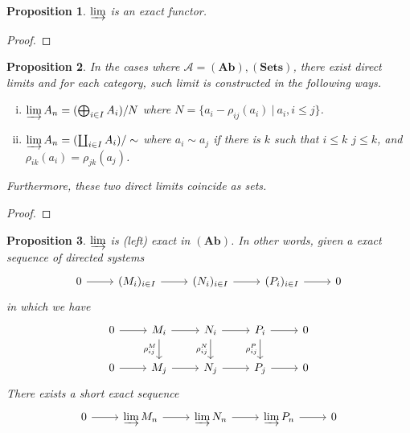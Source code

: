 \documentclass{article}
\newtheorem{proposition}{Proposition}[section]
\numberwithin{equation}{section}
\begin{document}
\begin{proposition}
\label{direct_limit_exact_functor}
$\varinjlim$ is an exact functor.\
\end{proposition}

\begin{proof}
\end{proof}

\begin{proposition}
In the cases where $\mathcal{A}=(\mathbf{Ab}),(\mathbf{Sets})$, there exist direct limits and for each category, such limit is constructed in the following ways.
\begin{enumerate}[i).]
\item $\varinjlim A_n = (\bigoplus_{i\in I}A_i)/N$ where $N=\{a_i-\rho_{ij}(a_i)\:|\:a_i,i\leq j\}$.
\item $\varinjlim A_n = (\coprod_{i\in I}A_i)/\sim$ where $a_i\sim a_j$ if there is $k$ such that $i\leq k$ $j\leq k$, and $\rho_{ik}(a_i)=\rho_{jk}(a_j)$.
\end{enumerate}
Furthermore, these two direct limits coincide as sets.
\end{proposition}

\begin{proof}
\end{proof}

\begin{proposition}
$\varinjlim$ is (left) exact in $(\mathbf{Ab})$. In other words, 
given a exact sequence of directed systems 
\[
\begin{tikzcd}
0 \arrow[r] & (M_i)_{i\in I} \arrow[r] & (N_i)_{i\in I} \arrow[r] & (P_i)_{i\in I} \arrow[r] & 0
\end{tikzcd}
\]
in which we have
\[
\begin{tikzcd}
0 \arrow[r] & M_i \arrow[r] \arrow[d, "\rho^M_{ij}"'] & N_i \arrow[r] \arrow[d, "\rho^N_{ij}"'] & P_i \arrow[r] \arrow[d, "\rho^P_{ij}"'] & 0 \\
0 \arrow[r] & M_j \arrow[r]                           & N_j \arrow[r]                           & P_j \arrow[r]                           & 0
\end{tikzcd}
\]
There exists a short exact sequence 
\[
\begin{tikzcd}
0 \arrow[r] & \varinjlim M_n \arrow[r] & \varinjlim N_n \arrow[r] & \varinjlim P_n \arrow[r] & 0
\end{tikzcd}
\]
\end{proposition}
\end{document}

